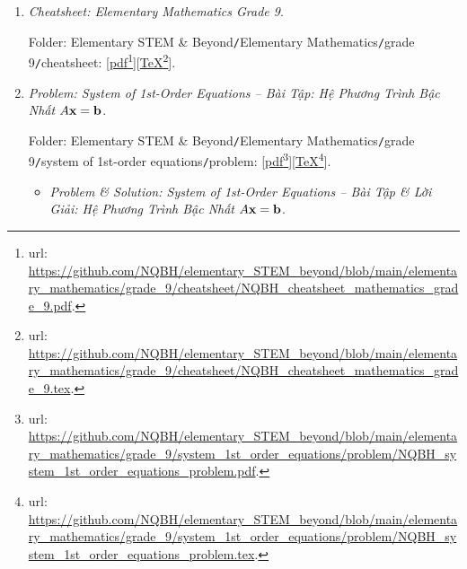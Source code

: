 \documentclass[12pt]{article}
\begin{document}
\begin{enumerate}
	\item {\it Cheatsheet: Elementary Mathematics Grade 9}.
	
	Folder: {\sf Elementary STEM \& Beyond{\tt/}Elementary Mathematics{\tt/}grade 9{\tt/}cheatsheet}: [\href{https://github.com/NQBH/elementary_STEM_beyond/blob/main/elementary_mathematics/grade_9/cheatsheet/NQBH_cheatsheet_mathematics_grade_9.pdf}{pdf}\footnote{{\sc url}: \url{https://github.com/NQBH/elementary_STEM_beyond/blob/main/elementary_mathematics/grade_9/cheatsheet/NQBH_cheatsheet_mathematics_grade_9.pdf}.}][\href{https://github.com/NQBH/elementary_STEM_beyond/blob/main/elementary_mathematics/grade_9/cheatsheet/NQBH_cheatsheet_mathematics_grade_9.tex}{\TeX}\footnote{{\sc url}: \url{https://github.com/NQBH/elementary_STEM_beyond/blob/main/elementary_mathematics/grade_9/cheatsheet/NQBH_cheatsheet_mathematics_grade_9.tex}.}].
	\item {\it Problem: System of 1st-Order Equations -- Bài Tập: Hệ Phương Trình Bậc Nhất $A{\bf x} = {\bf b}$}.
	
	Folder: {\sf Elementary STEM \& Beyond{\tt/}Elementary Mathematics{\tt/}grade 9{\tt/}system of 1st-order equations{\tt/}problem}: [\href{https://github.com/NQBH/elementary_STEM_beyond/blob/main/elementary_mathematics/grade_9/system_1st_order_equations/problem/NQBH_system_1st_order_equations_problem.pdf}{pdf}\footnote{{\sc url}: \url{https://github.com/NQBH/elementary_STEM_beyond/blob/main/elementary_mathematics/grade_9/system_1st_order_equations/problem/NQBH_system_1st_order_equations_problem.pdf}.}][\href{https://github.com/NQBH/elementary_STEM_beyond/blob/main/elementary_mathematics/grade_9/system_1st_order_equations/problem/NQBH_system_1st_order_equations_problem.tex}{\TeX}\footnote{{\sc url}: \url{https://github.com/NQBH/elementary_STEM_beyond/blob/main/elementary_mathematics/grade_9/system_1st_order_equations/problem/NQBH_system_1st_order_equations_problem.tex}.}].
	\begin{itemize}
		\item {\it Problem \& Solution: System of 1st-Order Equations -- Bài Tập \& Lời Giải: Hệ Phương Trình Bậc Nhất $A{\bf x} = {\bf b}$}.
		

\end{itemize}
\end{enumerate}
\end{document}
